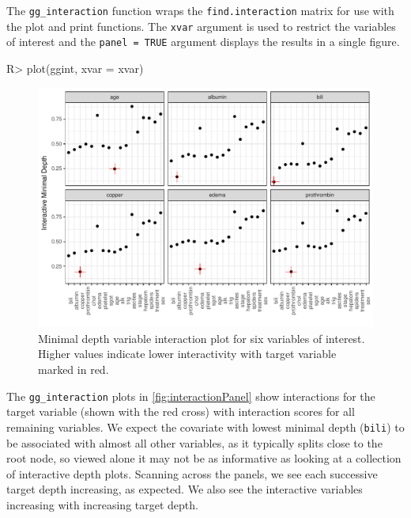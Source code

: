 \documentclass[article, nojss]{jss}
\begin{document}
The \texttt{gg\_interaction} function wraps the
\texttt{find.interaction} matrix for use with the 
plot and print functions. The \texttt{xvar} argument is used to restrict
the variables of interest and the \texttt{panel\ =\ TRUE} argument
displays the results in a single figure.

\begin{Schunk}
\begin{Sinput}
R> plot(ggint, xvar = xvar)
\end{Sinput}
\begin{figure}[!htb]

{\centering \includegraphics{rfs-interactionPanel-1}

}

\caption[Minimal depth variable interaction plot for six variables of interest]{Minimal depth variable interaction plot for six variables of interest. Higher values indicate lower interactivity with target variable marked in red.}\label{fig:interactionPanel}
\end{figure}
\end{Schunk}

The \texttt{gg\_interaction} plots in \autoref{fig:interactionPanel}
show interactions for the target variable (shown with the red cross)
with interaction scores for all remaining variables. We expect the
covariate with lowest minimal depth (\texttt{bili}) to be associated
with almost all other variables, as it typically splits close to the
root node, so viewed alone it may not be as informative as looking at a
collection of interactive depth plots. Scanning across the panels, we
see each successive target depth increasing, as expected. We also see
the interactive variables increasing with increasing target depth.
\end{document}
